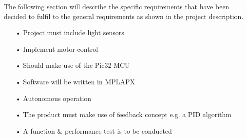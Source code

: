 The following section will describe the specific requirements that have been decided to fulfil to the general requirements as shown in the project description.
\begin{enumerate}
	\item[•]Project must include light sensors
	\item[•]Implement motor control				
	\item[•]Should make use of the Pic32 MCU
	\item[•]Software will be written in MPLAPX
	\item[•]Autonomous operation
	\item[•]The product must make use of feedback concept e.g. a PID algorithm
\item[•]A function \& performance test is to be conducted
\end{enumerate}
